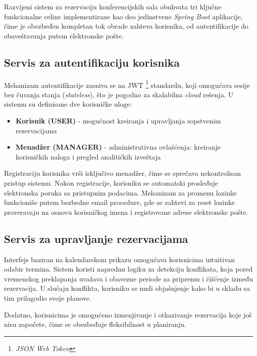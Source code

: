 \documentclass[12pt]{article}
\begin{document}
    Razvijeni sistem za rezervaciju konferencijskih sala obuhvata tri ključne funkcionalne celine implementirane kao deo jedinstvene \textit{Spring Boot} aplikacije, čime je obezbeđen kompletan tok obrade zahteva korisnika, od autentifikacije do obaveštavanja putem elektronske pošte.

    \subsection{Servis za autentifikaciju korisnika}

    Mehanizam autentifikacije zasniva se na JWT \footnote{\textit{JSON Web Token}} standardu, koji 
    omogućava sesije bez čuvanja stanja (\textit{stateless}), što je pogodno za skalabilna 
    \textit{cloud} rešenja. U sistemu su definisane dve korisničke uloge:
    \begin{itemize}
    \item \textbf{Korisnik (USER)} - mogućnost kreiranja i upravljanja sopstvenim rezervacijama
    \item \textbf{Menadžer (MANAGER)} - administrativna ovlašćenja: kreiranje korisničkih naloga i pregled analitičkih izveštaja
    \end{itemize}

    Registraciju korisnika vrši isključivo menadžer, čime se sprečava nekontrolisan pristup sistemu. Nakon registracije, korisniku se automatski prosleđuje elektronska poruka sa pristupnim podacima. Mehanizam za promenu lozinke funkcioniše putem bezbedne email procedure, gde se zahtevi za reset lozinke proveravaju na osnovu korisničkog imena i registrovane adrese elektronske pošte.

    \newpage
    \subsection{Servis za upravljanje rezervacijama}

    Interfejs baziran na kalendarskom prikazu omogućava korisnicima intuitivan odabir termina. Sistem 
    koristi naprednu logiku za detekciju konflikata, koja pored vremenskog preklapanja uvažava i 
    obavezne periode za pripremu i čišćenje između rezervacija. U slučaju konflikta, korisniku se 
    nudi objašnjenje kako bi u skladu sa tim prilagodio svoje planove.

    Dodatno, korisnicima je omogućeno izmenjivanje i otkazivanje rezervacija koje još nisu započete, čime se obezbeđuje fleksibilnost u planiranju.
\end{document}
